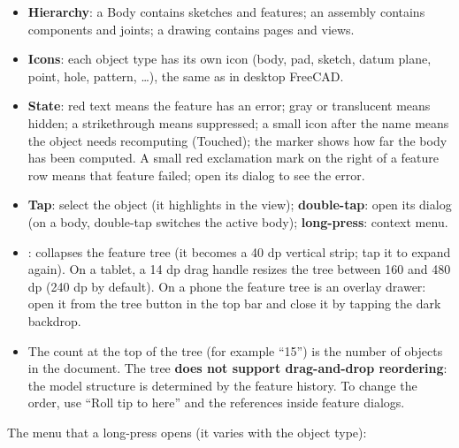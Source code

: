 \begin{itemize}
  \item \textbf{Hierarchy}: a Body contains sketches and features; an assembly contains components and joints;
        a drawing contains pages and views.
  \item \textbf{Icons}: each object type has its own icon (body, pad, sketch, datum plane, point, hole,
        pattern, …), the same as in desktop FreeCAD.
  \item \textbf{State}: red text means the feature has an error; gray or translucent means hidden; a
        strikethrough means suppressed; a small icon after the name means the object needs recomputing
        (Touched); the  marker shows how far the body has been computed. A small red exclamation mark
        on the right of a feature row means that feature failed; open its dialog to see the error.
  \item \textbf{Tap}: select the object (it highlights in the view); \textbf{double-tap}: open its dialog (on a
        body, double-tap switches the active body); \textbf{long-press}: context menu.
  \item {}: collapses the feature tree (it becomes a 40 dp vertical strip; tap it to expand again). On a
        tablet, a 14 dp drag handle resizes the tree between 160 and 480 dp (240 dp by default). On a phone
        the feature tree is an overlay drawer: open it from the tree button in the top bar and close it by
        tapping the dark backdrop.
  \item The count at the top of the tree (for example “15”) is the number of objects in the document. The tree
        \textbf{does not support drag-and-drop reordering}: the model structure is determined by the feature
        history. To change the order, use “Roll tip to here” and the references inside feature dialogs.
\end{itemize}


The menu that a long-press opens (it varies with the object type):

